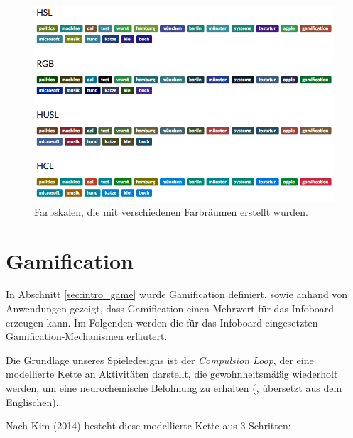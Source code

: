 \documentclass[12pt,twoside]{book}
\begin{document}
\begin{figure}[htbp]
    \centering
    \includegraphics[width=1.0\textwidth]{images/colors}
    \caption{Farbskalen, die mit verschiedenen Farbräumen erstellt wurden.}
    \label{fig:colors}
\end{figure}

\section{Gamification}\label{chap:game}


In Abschnitt \ref{sec:intro_game} wurde Gamification definiert, sowie anhand von Anwendungen gezeigt, dass Gamification einen Mehrwert für das Infoboard erzeugen kann. Im Folgenden werden die für das Infoboard eingesetzten Gamification-Mechanismen erläutert.

Die Grundlage unseres Spieledesigns ist der \textit{Compulsion Loop}, der \glqq eine modellierte Kette an Aktivitäten darstellt, die gewohnheitsmäßig wiederholt werden, um eine neurochemische Belohnung zu erhalten\grqq{} (\cite{gamasutra}, übersetzt aus dem Englischen)..

Nach Kim (2014) \citep{gamasutra} besteht diese modellierte Kette aus 3 Schritten:
\end{document}
